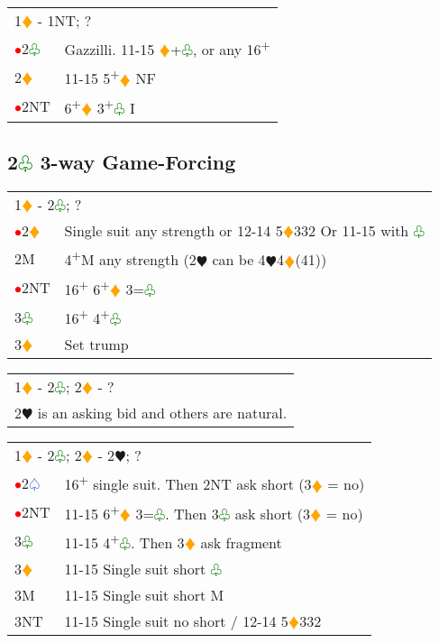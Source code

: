 \documentclass{article}
\renewcommand{\sp}{\textcolor{RoyalBlue}{$\varspade$}}
\newcommand{\he}{\textcolor{RubineRed}{$\varheart$}}
\newcommand{\di}{\textcolor{Orange}{$\vardiamond$}}
\newcommand{\cl}{\textcolor{Green}{$\varclub$}}
\newcommand{\nt}{\relsize{-1}NT\relsize{1}}
\newcommand{\up}{\textsuperscript{+}}
\newcommand{\al}{\textcolor{red}{$\bullet$}}
\begin{document}
\medskip

\begin{tabular}{|l|p{6.5cm}}
	\multicolumn{2}{l}{1\di{} - 1\nt{}; ?}\\
	\al{}2\cl{} & Gazzilli. 11-15 \di{}+\cl{}, or any 16\up \\
    2\di{} & 11-15 5\up\di{} NF \\
    \al{}2\nt{} & 6\up{}\di{} 3\up{}\cl{} I \\
\end{tabular}


\subsection{2\cl{} 3-way Game-Forcing}

\begin{tabular}{|l|p{6.5cm}}
	\multicolumn{2}{l}{1\di{} - 2\cl{}; ?} \\
	\al{}2\di{} & Single suit any strength or 12-14 5\di{}332 Or 11-15 with \cl{} \\
	2M & 4\up{}M any strength (2\he{} can be 4\he{}4\di{}(41)) \\
	\al{}2\nt{} & 16\up{} 6\up\di{} 3=\cl{} \\
	3\cl{} & 16\up{} 4\up{}\cl{} \\
	3\di{} & Set trump \\
\end{tabular}

\medskip

\begin{tabular}{|l|p{6.5cm}}
	\multicolumn{2}{l}{1\di{} - 2\cl{}; 2\di{} - ?}\\
	\multicolumn{2}{l}{2\he{} is an asking bid and others are natural.}
\end{tabular}

\medskip

\begin{tabular}{|l|p{6.5cm}}
	\multicolumn{2}{l}{1\di{} - 2\cl{}; 2\di{} - 2\he{}; ?}\\
	\al{}2\sp{} & 16\up{} single suit. Then 2\nt{} ask short (3\di{} = no) \\ 
	\al{}2\nt{} & 11-15 6\up{}\di{} 3=\cl{}. Then 3\cl{} ask short (3\di{} = no) \\
	3\cl{} & 11-15 4\up{}\cl{}. Then 3\di{} ask fragment \\ 
	3\di{} & 11-15 Single suit short \cl{} \\
	3M & 11-15 Single suit short M \\
	3\nt{} & 11-15 Single suit no short / 12-14 5\di{}332 \\
\end{tabular}
\end{document}
